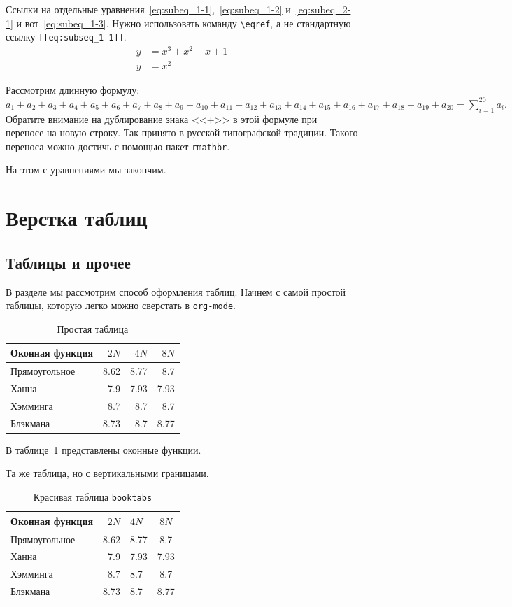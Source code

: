\documentclass[12pt]{extarticle}
\begin{document}
Ссылки на отдельные уравнения~\eqref{eq:subeq_1-1},~\eqref{eq:subeq_1-2} и~\eqref{eq:subeq_2-1} и вот~\eqref{eq:subeq_1-3}.
Нужно использовать команду \texttt{\textbackslash{}eqref}, а не стандартную ссылку \texttt{[[eq:subseq\_1-1]]}.
\begin{subequations}
\label{eq:subeq_2}
\begin{align}
        y & = x^3 + x^2 + x + 1\label{eq:subeq_2-1} \\
        y & = x^2
    \end{align}
\end{subequations}

Рассмотрим длинную формулу:
\(a_1+a_2+a_3+a_4+a_5+a_6+a_7+a_8+a_{9}+a_{10}+a_{11}+a_{12}+a_{13}+a_{14}+a_{15}+a_{16}+a_{17}+a_{18}+a_{19}+a_{20}=\sum_{i=1}^{20}a_{i}.\)
Обратите внимание на дублирование знака {}<<+>>{} в этой формуле при переносе на новую строку.
Так принято в русской типографской традиции.
Такого переноса можно достичь с помощью пакет \texttt{rmathbr}.

На этом с уравнениями мы закончим.
\section{Верстка таблиц}
\label{sec:orgef5b7ec}
\subsection{Таблицы и прочее}
\label{sec:org2528aa4}
В разделе мы рассмотрим способ оформления таблиц.
Начнем с самой простой таблицы, которую легко можно сверстать в \texttt{org-mode}.
\begin{table}[htbp]
\caption{\label{tab:table1}Простая таблица}
\centering
\begin{tabular}{lrrr}
\hline
Оконная функция & \(2N\) & \(4N\) & \(8N\)\\
\hline
Прямоугольное & 8.62 & 8.77 & 8.7\\
\hline
Ханна & 7.9 & 7.93 & 7.93\\
\hline
Хэмминга & 8.7 & 8.7 & 8.7\\
\hline
Блэкмана & 8.73 & 8.7 & 8.77\\
\hline
\end{tabular}
\end{table}

В таблице~\ref{tab:table1} представлены оконные функции.

Та же таблица, но с вертикальными границами.

\begin{table}[htbp]
\caption{\label{tab:table2}Красивая таблица \texttt{booktabs}}
\centering
\begin{tabular}{|l|r|l|c|}
\toprule
\textbf{Оконная функция} & \textbf{\(2N\)} & \textbf{\(4N\)} & \textbf{\(8N\)}\\
\midrule
Прямоугольное & 8.62 & 8.77 & 8.7\\
Ханна & 7.9 & 7.93 & 7.93\\
Хэмминга & 8.7 & 8.7 & 8.7\\
Блэкмана & 8.73 & 8.7 & 8.77\\
\bottomrule
\end{tabular}
\end{table}
\end{document}

